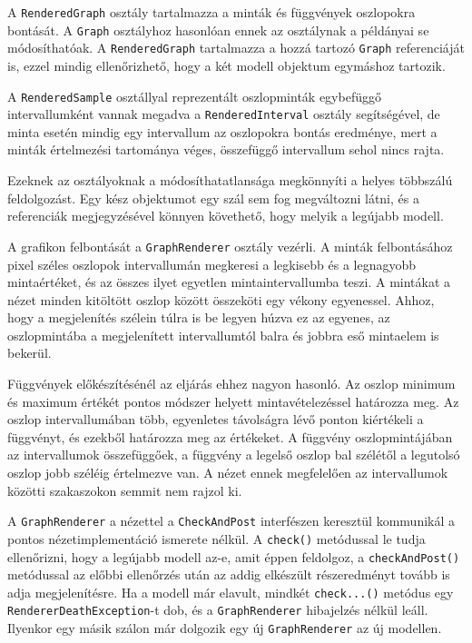 A \texttt{RenderedGraph} osztály tartalmazza a minták és függvények oszlopokra bontását.
A \texttt{Graph} osztályhoz hasonlóan ennek az osztálynak a példányai se módosíthatóak.
A \texttt{RenderedGraph} tartalmazza a hozzá tartozó \texttt{Graph} referenciáját is, ezzel mindig ellenőrizhető, hogy a két modell objektum egymáshoz tartozik.

A \texttt{RenderedSample} osztállyal reprezentált oszlopminták egybefüggő intervallumként vannak megadva a \texttt{RenderedInterval} osztály segítségével, de minta esetén mindig egy intervallum az oszlopokra bontás eredménye, mert a minták értelmezési tartománya véges, összefüggő intervallum sehol nincs rajta.

Ezeknek az osztályoknak a módosíthatatlansága megkönnyíti a helyes többszálú feldolgozást.
Egy kész objektumot egy szál sem fog megváltozni látni, és a referenciák megjegyzésével könnyen követhető, hogy melyik a legújabb modell.

A grafikon felbontását a \texttt{GraphRenderer} osztály vezérli.
A minták felbontásához pixel széles oszlopok intervallumán megkeresi a legkisebb és a legnagyobb mintaértéket, és az összes ilyet egyetlen mintaintervallumba teszi.
A mintákat a nézet minden kitöltött oszlop között összeköti egy vékony egyenessel.
Ahhoz, hogy a megjelenítés szélein túlra is be legyen húzva ez az egyenes, az oszlopmintába a megjelenített intervallumtól balra és jobbra eső mintaelem is bekerül.

Függvények előkészítésénél az eljárás ehhez nagyon hasonló.
Az oszlop minimum és maximum értékét pontos módszer helyett mintavételezéssel határozza meg. Az oszlop intervallumában több, egyenletes távolságra lévő ponton kiértékeli a függvényt, és ezekből határozza meg az értékeket.
A függvény oszlopmintájában az intervallumok összefüggőek, a függvény a legelső oszlop bal szélétől a legutolsó oszlop jobb széléig értelmezve van.
A nézet ennek megfelelően az intervallumok közötti szakaszokon semmit nem rajzol ki.

A \texttt{GraphRenderer} a nézettel a \texttt{CheckAndPost} interfészen keresztül kommunikál a pontos nézetimplementáció ismerete nélkül.
A \texttt{check()} metódussal le tudja ellenőrizni, hogy a legújabb modell az-e, amit éppen feldolgoz, a \texttt{checkAndPost()} metódussal az előbbi ellenőrzés után az addig elkészült részeredményt tovább is adja megjelenítésre.
Ha a modell már elavult, mindkét \texttt{check...()} metódus egy \texttt{RendererDeathException}-t dob, és a \texttt{GraphRenderer} hibajelzés nélkül leáll. Ilyenkor egy másik szálon már dolgozik egy új \texttt{GraphRenderer} az új modellen.

